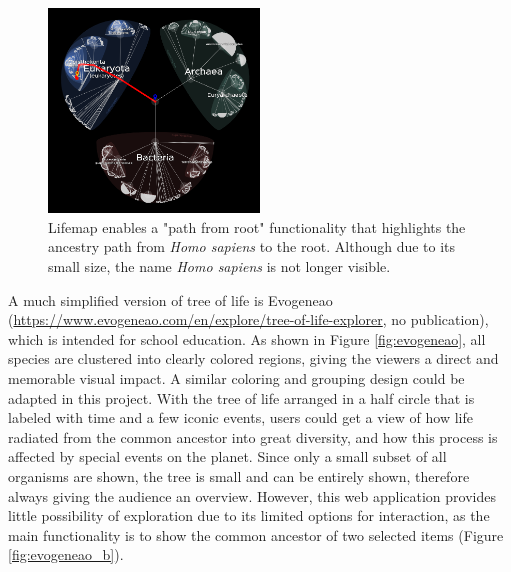 \documentclass[11pt, a4paper,oneside,chapterprefix=false]{scrbook}
\begin{document}
\begin{figure}[h]
	\centering
	\includegraphics[width=0.5\textwidth]{figures/related_work/lifemap}
	\caption{Lifemap enables a "path from root" functionality that highlights the ancestry path from \textit{Homo sapiens} to the root. Although due to its small size, the name \textit{Homo sapiens} is not longer visible.}
	\label{fig:lifemap}
\end{figure}

A much simplified version of tree of life is Evogeneao (\url{https://www.evogeneao.com/en/explore/tree-of-life-explorer}, no publication), which is intended for school education. As shown in Figure \ref{fig:evogeneao}, all species are clustered into clearly colored regions, giving the viewers a direct and memorable visual impact. A similar coloring and grouping design could be adapted in this project. With the tree of life arranged in a half circle that is labeled with time and a few iconic events, users could get a view of how life radiated from the common ancestor into great diversity, and how this process is affected by special events on the planet. Since only a small subset of all organisms are shown, the tree is small and can be entirely shown, therefore always giving the audience an overview. However, this web application provides little possibility of exploration due to its limited options for interaction, as the main functionality is to show the common ancestor of two selected items (Figure \ref{fig:evogeneao_b}).\\
\end{document}
